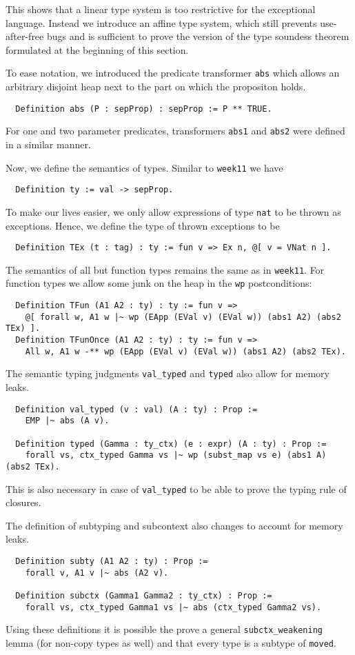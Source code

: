 \documentclass{article}
\begin{document}
This shows that a linear type system is too restrictive for the exceptional language. Instead we introduce an affine type system, which still prevents use-after-free bugs and is sufficient to prove the version of the type soundess theorem formulated at the beginning of this section.

To ease notation, we introduced the predicate transformer \texttt{abs} which allows an arbitrary disjoint heap next to the part on which the propositon holds.
\begin{lstlisting}
  Definition abs (P : sepProp) : sepProp := P ** TRUE.
\end{lstlisting}
For one and two parameter predicates, transformers \texttt{abs1} and \texttt{abs2} were defined in a similar manner.

Now, we define the semantics of types. Similar to \texttt{week11} we have
\begin{lstlisting}
  Definition ty := val -> sepProp.
\end{lstlisting}
To make our lives easier, we only allow expressions of type \texttt{nat} to be thrown as exceptions. Hence, we define the type of thrown exceptions to be
\begin{lstlisting}
  Definition TEx (t : tag) : ty := fun v => Ex n, @[ v = VNat n ].
\end{lstlisting}
The semantics of all but function types remains the same as in \texttt{week11}. For function types we allow some junk on the heap in the \texttt{wp} postconditions:
\begin{lstlisting}
  Definition TFun (A1 A2 : ty) : ty := fun v =>
    @[ forall w, A1 w |~ wp (EApp (EVal v) (EVal w)) (abs1 A2) (abs2 TEx) ].
  Definition TFunOnce (A1 A2 : ty) : ty := fun v =>
    All w, A1 w -** wp (EApp (EVal v) (EVal w)) (abs1 A2) (abs2 TEx).
\end{lstlisting}
The semantic typing judgments \texttt{val\_typed} and  \texttt{typed} also allow for memory leaks.
\begin{lstlisting}
  Definition val_typed (v : val) (A : ty) : Prop :=
    EMP |~ abs (A v).
  
  Definition typed (Gamma : ty_ctx) (e : expr) (A : ty) : Prop :=
    forall vs, ctx_typed Gamma vs |~ wp (subst_map vs e) (abs1 A) (abs2 TEx).
\end{lstlisting}
This is also necessary in case of \texttt{val\_typed} to be able to prove the typing rule of closures.

The definition of subtyping and subcontext also changes to account for memory leaks.
\begin{lstlisting}
  Definition subty (A1 A2 : ty) : Prop :=
    forall v, A1 v |~ abs (A2 v).
  
  Definition subctx (Gamma1 Gamma2 : ty_ctx) : Prop :=
    forall vs, ctx_typed Gamma1 vs |~ abs (ctx_typed Gamma2 vs).
\end{lstlisting}
Using these definitions it is possible the prove a general \texttt{subctx\_weakening} lemma (for non-copy types as well) and that every type is a subtype of \texttt{moved}.
\end{document}
